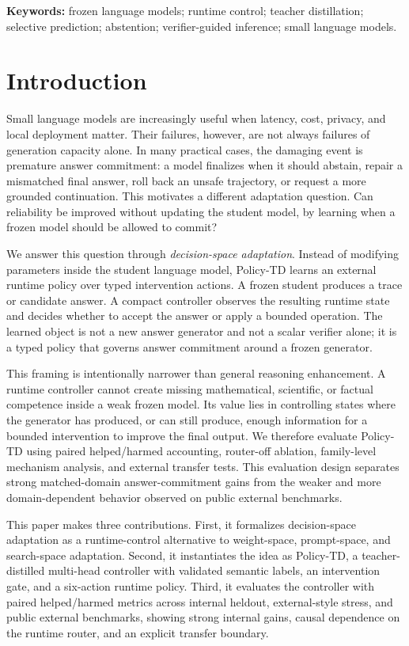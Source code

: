 \documentclass[11pt]{article}
\newcommand{\policytd}{Policy-TD}
\begin{document}
\noindent\textbf{Keywords:} frozen language models; runtime control; teacher distillation; selective prediction; abstention; verifier-guided inference; small language models.

\section{Introduction}
Small language models are increasingly useful when latency, cost, privacy, and local deployment matter. Their failures, however, are not always failures of generation capacity alone. In many practical cases, the damaging event is premature answer commitment: a model finalizes when it should abstain, repair a mismatched final answer, roll back an unsafe trajectory, or request a more grounded continuation. This motivates a different adaptation question. Can reliability be improved without updating the student model, by learning when a frozen model should be allowed to commit?

We answer this question through \emph{decision-space adaptation}. Instead of modifying parameters inside the student language model, \policytd{} learns an external runtime policy over typed intervention actions. A frozen student produces a trace or candidate answer. A compact controller observes the resulting runtime state and decides whether to accept the answer or apply a bounded operation. The learned object is not a new answer generator and not a scalar verifier alone; it is a typed policy that governs answer commitment around a frozen generator.

This framing is intentionally narrower than general reasoning enhancement. A runtime controller cannot create missing mathematical, scientific, or factual competence inside a weak frozen model. Its value lies in controlling states where the generator has produced, or can still produce, enough information for a bounded intervention to improve the final output. We therefore evaluate \policytd{} using paired helped/harmed accounting, router-off ablation, family-level mechanism analysis, and external transfer tests. This evaluation design separates strong matched-domain answer-commitment gains from the weaker and more domain-dependent behavior observed on public external benchmarks.

This paper makes three contributions. First, it formalizes decision-space adaptation as a runtime-control alternative to weight-space, prompt-space, and search-space adaptation. Second, it instantiates the idea as \policytd{}, a teacher-distilled multi-head controller with validated semantic labels, an intervention gate, and a six-action runtime policy. Third, it evaluates the controller with paired helped/harmed metrics across internal heldout, external-style stress, and public external benchmarks, showing strong internal gains, causal dependence on the runtime router, and an explicit transfer boundary.
\end{document}
